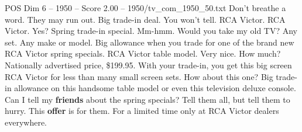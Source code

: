 \begin{textsample}{POS Dim 6 – 1950 – Score 2.00 – 1950/tv\_com\_1950\_50.txt}  \label{ex:f6_pos_006}
Don't breathe a word.
They may run out.
Big trade-in deal.
You won't tell.
RCA Victor.
RCA Victor.
Yes?
Spring trade-in special.
Mm-hmm.
Would you take my old TV?
Any set.
Any make or model.
Big allowance when you trade for one of the brand new RCA Victor spring specials.
RCA Victor table model.
Very nice.
How much?
Nationally advertised price, \$199.95.
With your trade-in, you get this big screen RCA Victor for less than many small screen sets.
How about this one?
Big trade-in allowance on this handsome table model or even this television deluxe console.
Can I tell my \textbf{friends} about the spring specials?
Tell them all, but tell them to hurry.
This \textbf{offer} is for them.
For a limited time only at RCA Victor dealers everywhere.

\end{textsample}
